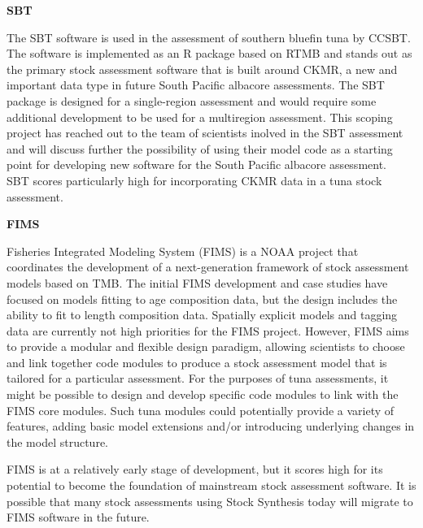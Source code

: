 \documentclass{SCreport}
\begin{document}
\vspace{1ex}

\textbf{SBT}

\vspace{-1ex}

The SBT software is used in the assessment of southern bluefin tuna by CCSBT.
The software is implemented as an R package based on RTMB and stands out as the
primary stock assessment software that is built around CKMR, a new and important
data type in future South Pacific albacore assessments. The SBT package is
designed for a single-region assessment and would require some additional
development to be used for a multiregion assessment. This scoping project has
reached out to the team of scientists inolved in the SBT assessment and will
discuss further the possibility of using their model code as a starting point
for developing new software for the South Pacific albacore assessment.\\[-4.5ex]

SBT scores particularly high for incorporating CKMR data in a tuna stock
assessment.

\vspace{1ex}

\textbf{FIMS}

\vspace{-1ex}

Fisheries Integrated Modeling System (FIMS) is a NOAA project that coordinates
the development of a next-generation framework of stock assessment models based
on TMB. The initial FIMS development and case studies have focused on models
fitting to age composition data, but the design includes the ability to fit to
length composition data. Spatially explicit models and tagging data are
currently not high priorities for the FIMS project. However, FIMS aims to
provide a modular and flexible design paradigm, allowing scientists to choose
and link together code modules to produce a stock assessment model that is
tailored for a particular assessment. For the purposes of tuna assessments, it
might be possible to design and develop specific code modules to link with the
FIMS core modules. Such tuna modules could potentially provide a variety of
features, adding basic model extensions and/or introducing underlying changes in
the model structure.

FIMS is at a relatively early stage of development, but it scores high for its
potential to become the foundation of mainstream stock assessment software. It
is possible that many stock assessments using Stock Synthesis today will migrate
to FIMS software in the future.
\end{document}
